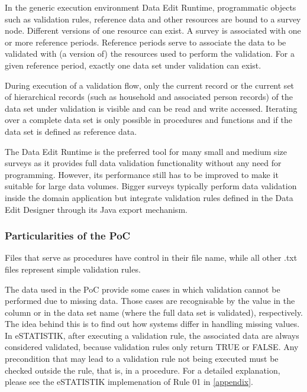 In the generic execution environment Data Edit Runtime, programmatic objects such as validation rules, reference data and other resources are bound to a survey node. Different versions of one resource can exist. A survey is associated with one or more reference periods. Reference periods serve to associate the data to be validated with (a version of) the resources used to perform the validation. For a given reference period, exactly one data set under validation can exist.

During execution of a validation flow, only the current record or the current set of hierarchical records (such as household and associated person records) of the data set under validation is visible and can be read and write accessed. Iterating over a complete data set is only possible in procedures and functions and if the data set is defined as reference data.

The Data Edit Runtime is the preferred tool for many small and medium size surveys as it provides full data validation functionality without any need for programming. However, its performance still has to be improved to make it suitable for large data volumes. Bigger surveys typically perform data validation inside the domain application but integrate validation rules defined in the Data Edit Designer through its Java export mechanism.

\subsubsection{Particularities of the PoC}

Files that serve as procedures have control in their file name, while all other .txt files represent simple validation rules.


The data used in the PoC provide some cases in which validation cannot be performed due to missing data. Those cases are recognisable by the value  in the column  or in the data set name (where the full data set is validated), respectively. The idea behind this is to find out how systems differ in handling missing values. In eSTATISTIK, after executing a validation rule, the associated data are always considered validated, because validation rules only return TRUE or FALSE. Any precondition that may lead to a validation rule not being executed must be checked outside the rule, that is, in a procedure. For a detailed explanation, please see the eSTATISTIK implemenation of Rule 01
in \ref{appendix}.
